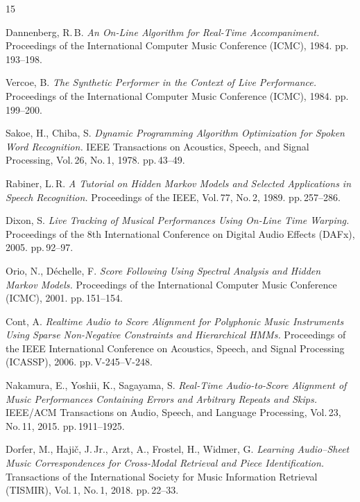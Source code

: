 \documentclass[a4paper,11pt]{article}
\begin{document}
\newpage
\begin{thebibliography}{15}

  Dannenberg, R.\,B.
  \textit{An On-Line Algorithm for Real-Time Accompaniment.}
  Proceedings of the International Computer Music Conference (ICMC), 1984.
  pp.\,193--198.

  Vercoe, B.
  \textit{The Synthetic Performer in the Context of Live Performance.}
  Proceedings of the International Computer Music Conference (ICMC), 1984.
  pp.\,199--200.

  Sakoe, H., Chiba, S.
  \textit{Dynamic Programming Algorithm Optimization for Spoken Word Recognition.}
  IEEE Transactions on Acoustics, Speech, and Signal Processing,
  Vol.\,26, No.\,1, 1978. pp.\,43--49.

  Rabiner, L.\,R.
  \textit{A Tutorial on Hidden Markov Models and Selected Applications in Speech Recognition.}
  Proceedings of the IEEE, Vol.\,77, No.\,2, 1989. pp.\,257--286.

  Dixon, S.
  \textit{Live Tracking of Musical Performances Using On-Line Time Warping.}
  Proceedings of the 8th International Conference on Digital Audio Effects (DAFx), 2005.
  pp.\,92--97.

  Orio, N., Déchelle, F.
  \textit{Score Following Using Spectral Analysis and Hidden Markov Models.}
  Proceedings of the International Computer Music Conference (ICMC), 2001.
  pp.\,151--154.

  Cont, A.
  \textit{Realtime Audio to Score Alignment for Polyphonic Music Instruments Using Sparse Non-Negative Constraints and Hierarchical HMMs.}
  Proceedings of the IEEE International Conference on Acoustics, Speech, and Signal Processing (ICASSP), 2006.
  pp.\,V-245--V-248.

  Nakamura, E., Yoshii, K., Sagayama, S.
  \textit{Real-Time Audio-to-Score Alignment of Music Performances Containing Errors and Arbitrary Repeats and Skips.}
  IEEE/ACM Transactions on Audio, Speech, and Language Processing,
  Vol.\,23, No.\,11, 2015. pp.\,1911--1925.

  Dorfer, M., Hajič, J.\,Jr., Arzt, A., Frostel, H., Widmer, G.
  \textit{Learning Audio--Sheet Music Correspondences for Cross-Modal Retrieval and Piece Identification.}
  Transactions of the International Society for Music Information Retrieval (TISMIR),
  Vol.\,1, No.\,1, 2018. pp.\,22--33.


\end{thebibliography}
\end{document}
